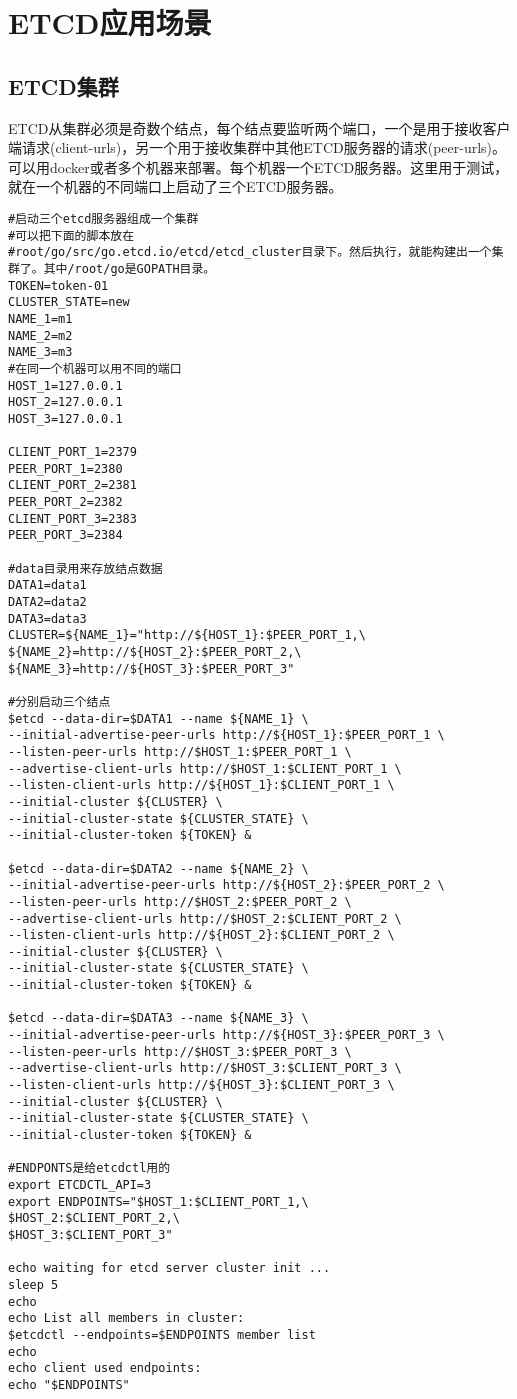 \mylineskip
\chapter{ETCD应用场景}\label{chaper:ch1}
\section{ETCD集群}
ETCD从集群必须是奇数个结点，每个结点要监听两个端口，一个是用于接收客户端请求(client-urls)，另一个用于接收集群中其他ETCD服务器的请求(peer-urls)。
可以用docker或者多个机器来部署。每个机器一个ETCD服务器。这里用于测试，就在一个机器的不同端口上启动了三个ETCD服务器。
\begin{verbatim}
#启动三个etcd服务器组成一个集群
#可以把下面的脚本放在
#root/go/src/go.etcd.io/etcd/etcd_cluster目录下。然后执行，就能构建出一个集群了。其中/root/go是GOPATH目录。
TOKEN=token-01
CLUSTER_STATE=new
NAME_1=m1
NAME_2=m2
NAME_3=m3
#在同一个机器可以用不同的端口
HOST_1=127.0.0.1
HOST_2=127.0.0.1
HOST_3=127.0.0.1

CLIENT_PORT_1=2379
PEER_PORT_1=2380
CLIENT_PORT_2=2381
PEER_PORT_2=2382
CLIENT_PORT_3=2383
PEER_PORT_3=2384

#data目录用来存放结点数据
DATA1=data1
DATA2=data2
DATA3=data3
CLUSTER=${NAME_1}="http://${HOST_1}:$PEER_PORT_1,\
${NAME_2}=http://${HOST_2}:$PEER_PORT_2,\
${NAME_3}=http://${HOST_3}:$PEER_PORT_3"

#分别启动三个结点
$etcd --data-dir=$DATA1 --name ${NAME_1} \
--initial-advertise-peer-urls http://${HOST_1}:$PEER_PORT_1 \
--listen-peer-urls http://$HOST_1:$PEER_PORT_1 \
--advertise-client-urls http://$HOST_1:$CLIENT_PORT_1 \
--listen-client-urls http://${HOST_1}:$CLIENT_PORT_1 \
--initial-cluster ${CLUSTER} \
--initial-cluster-state ${CLUSTER_STATE} \
--initial-cluster-token ${TOKEN} &

$etcd --data-dir=$DATA2 --name ${NAME_2} \
--initial-advertise-peer-urls http://${HOST_2}:$PEER_PORT_2 \
--listen-peer-urls http://$HOST_2:$PEER_PORT_2 \
--advertise-client-urls http://$HOST_2:$CLIENT_PORT_2 \
--listen-client-urls http://${HOST_2}:$CLIENT_PORT_2 \
--initial-cluster ${CLUSTER} \
--initial-cluster-state ${CLUSTER_STATE} \
--initial-cluster-token ${TOKEN} &

$etcd --data-dir=$DATA3 --name ${NAME_3} \
--initial-advertise-peer-urls http://${HOST_3}:$PEER_PORT_3 \
--listen-peer-urls http://$HOST_3:$PEER_PORT_3 \
--advertise-client-urls http://$HOST_3:$CLIENT_PORT_3 \
--listen-client-urls http://${HOST_3}:$CLIENT_PORT_3 \
--initial-cluster ${CLUSTER} \
--initial-cluster-state ${CLUSTER_STATE} \
--initial-cluster-token ${TOKEN} &

#ENDPONTS是给etcdctl用的
export ETCDCTL_API=3
export ENDPOINTS="$HOST_1:$CLIENT_PORT_1,\
$HOST_2:$CLIENT_PORT_2,\
$HOST_3:$CLIENT_PORT_3"

echo waiting for etcd server cluster init ...
sleep 5
echo
echo List all members in cluster:
$etcdctl --endpoints=$ENDPOINTS member list
echo
echo client used endpoints:
echo "$ENDPOINTS"


\end{verbatim}
